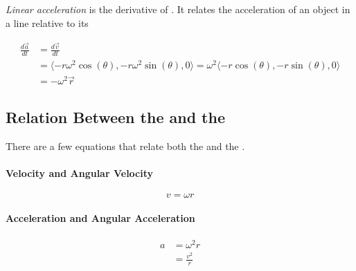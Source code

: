 \begin{definition}\label{def:Linear Acceleration}
  \emph{Linear acceleration} is the derivative of .
  It relates the acceleration of an object in a line relative to its 

  \begin{equation}\label{eq:Linear Acceleration}
    \begin{aligned}
      \frac{d \vec{a}}{dt} &= \frac{d \vec{v}}{dt} \\
      &= \langle -r \omega^{2} \cos(\theta), -r \omega^{2} \sin(\theta), 0 \rangle = \omega^{2} \langle -r \cos(\theta), -r \sin(\theta), 0 \rangle \\
      &= - \omega^{2} \vec{r}
    \end{aligned}
  \end{equation}
\end{definition}

\subsection{Relation Between the  and the }\label{subsec:Relations Circular Motion}
There are a few equations that relate both the  and the .
\paragraph{Velocity and Angular Velocity}\label{par:Relate Velocity Angular Velocity}
\begin{equation}\label{eq:Relate Velocity Angular Velocity}
  v = \omega r
\end{equation}

\paragraph{Acceleration and Angular Acceleration}\label{par:Relate Acceleration Angular Acceleration}
\begin{equation}\label{eq:Relate Acceleration Angular Acceleration}
  \begin{aligned}
    a &= \omega^{2} r \\
    &= \frac{v^{2}}{r} \\
  \end{aligned}
\end{equation}

